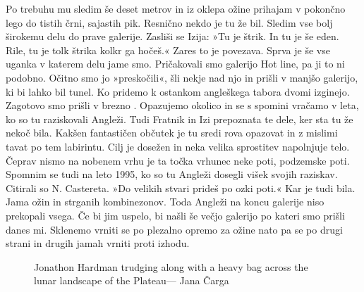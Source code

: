 Po trebuhu mu sledim še deset metrov in iz oklepa ožine prihajam v pokončno lego do tistih črni, sajastih pik. Resnično nekdo je tu že bil. Sledim vse bolj širokemu delu do prave galerije. Zasliši se Izija: »Tu je štrik. In tu je še eden. Rile, tu je tolk štrika kolkr ga hočeš.« Zares to je povezava. Sprva je še vse uganka v katerem delu jame smo. Pričakovali smo galerijo Hot line, pa ji to ni podobno. Očitno smo jo »preskočili«, šli nekje nad njo in prišli v manjšo galerijo, ki bi lahko bil  tunel. Ko pridemo k ostankom  angleškega tabora dvomi izginejo.  Zagotovo smo prišli  v brezno . Opazujemo okolico in se s spomini vračamo v leta, ko so tu raziskovali Angleži. Tudi Fratnik in Izi prepoznata te dele, ker sta tu že nekoč bila. Kakšen fantastičen občutek je tu sredi rova opazovat in z mislimi tavat po tem labirintu. Cilj je dosežen in neka velika sprostitev napolnjuje telo. Čeprav nismo na nobenem vrhu je ta točka vrhunec neke poti, podzemske poti. Spomnim se tudi na leto 1995, ko so tu Angleži dosegli višek svojih raziskav. Citirali so N. Castereta. »Do velikih stvari prideš po ozki poti.« Kar je  tudi bila. Jama ožin in strganih kombinezonov. Toda Angleži na koncu galerije niso prekopali vsega. Če bi jim uspelo, bi našli še večjo galerijo po kateri smo prišli danes mi. 
  Sklenemo vrniti se po plezalno opremo za ožine nato pa se po drugi strani in drugih jamah vrniti proti izhodu. 
\begin{figure}[t!]
\checkoddpage \ifoddpage \forcerectofloat \else \forceversofloat \fi
\centering
{}
\caption{Jonathon Hardman trudging along with a heavy bag across the lunar landscape of the  Plateau--- Jana Čarga }
\label{mig surface jon hardman}
\end{figure}
